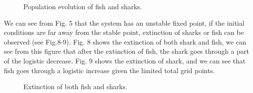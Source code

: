 \documentclass[aps,prl,preprint,superscriptaddress]{revtex4}
\begin{document}
\begin{figure}[H]
	\centering
	\caption{Population evolution of fish and sharks.}
	\label{more_clusters} 
\end{figure}

We can see from Fig. 5 that the system has an unstable fixed point, if the initial conditions are far away from the stable point, extinction of sharks or fish can be observed (see Fig.8-9). Fig. 8 shows the extinction of both shark and fish, we can see from this figure that after the extinction of fish, the shark goes through a part of the logistic decrease. Fig. 9 shows the extinction of shark, and we can see that fish goes through a logistic increase given the limited total grid points.


\begin{figure}[H]
	\centering
	\caption{Extinction of both fish and sharks.}
	\label{more_clusters} 
\end{figure}
\end{document}
